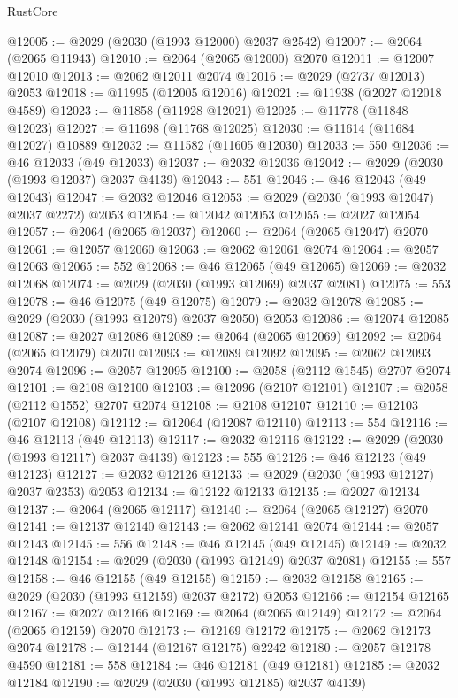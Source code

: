 \begin{lexlean}{RustCore}
\begin{coremodule}
@12005 := @2029 (@2030 (@1993 @12000) @2037 @2542)
@12007 := @2064 (@2065 @11943)
@12010 := @2064 (@2065 @12000) @2070
@12011 := @12007 @12010
@12013 := @2062 @12011 @2074
@12016 := @2029 (@2737 @12013) @2053
@12018 := @11995 (@12005 @12016)
@12021 := @11938 (@2027 @12018 @4589)
@12023 := @11858 (@11928 @12021)
@12025 := @11778 (@11848 @12023)
@12027 := @11698 (@11768 @12025)
@12030 := @11614 (@11684 @12027) @10889
@12032 := @11582 (@11605 @12030)
@12033 := 550
@12036 := @46 @12033 (@49 @12033)
@12037 := @2032 @12036
@12042 := @2029 (@2030 (@1993 @12037) @2037 @4139)
@12043 := 551
@12046 := @46 @12043 (@49 @12043)
@12047 := @2032 @12046
@12053 := @2029 (@2030 (@1993 @12047) @2037 @2272) @2053
@12054 := @12042 @12053
@12055 := @2027 @12054
@12057 := @2064 (@2065 @12037)
@12060 := @2064 (@2065 @12047) @2070
@12061 := @12057 @12060
@12063 := @2062 @12061 @2074
@12064 := @2057 @12063
@12065 := 552
@12068 := @46 @12065 (@49 @12065)
@12069 := @2032 @12068
@12074 := @2029 (@2030 (@1993 @12069) @2037 @2081)
@12075 := 553
@12078 := @46 @12075 (@49 @12075)
@12079 := @2032 @12078
@12085 := @2029 (@2030 (@1993 @12079) @2037 @2050) @2053
@12086 := @12074 @12085
@12087 := @2027 @12086
@12089 := @2064 (@2065 @12069)
@12092 := @2064 (@2065 @12079) @2070
@12093 := @12089 @12092
@12095 := @2062 @12093 @2074
@12096 := @2057 @12095
@12100 := @2058 (@2112 @1545) @2707 @2074
@12101 := @2108 @12100
@12103 := @12096 (@2107 @12101)
@12107 := @2058 (@2112 @1552) @2707 @2074
@12108 := @2108 @12107
@12110 := @12103 (@2107 @12108)
@12112 := @12064 (@12087 @12110)
@12113 := 554
@12116 := @46 @12113 (@49 @12113)
@12117 := @2032 @12116
@12122 := @2029 (@2030 (@1993 @12117) @2037 @4139)
@12123 := 555
@12126 := @46 @12123 (@49 @12123)
@12127 := @2032 @12126
@12133 := @2029 (@2030 (@1993 @12127) @2037 @2353) @2053
@12134 := @12122 @12133
@12135 := @2027 @12134
@12137 := @2064 (@2065 @12117)
@12140 := @2064 (@2065 @12127) @2070
@12141 := @12137 @12140
@12143 := @2062 @12141 @2074
@12144 := @2057 @12143
@12145 := 556
@12148 := @46 @12145 (@49 @12145)
@12149 := @2032 @12148
@12154 := @2029 (@2030 (@1993 @12149) @2037 @2081)
@12155 := 557
@12158 := @46 @12155 (@49 @12155)
@12159 := @2032 @12158
@12165 := @2029 (@2030 (@1993 @12159) @2037 @2172) @2053
@12166 := @12154 @12165
@12167 := @2027 @12166
@12169 := @2064 (@2065 @12149)
@12172 := @2064 (@2065 @12159) @2070
@12173 := @12169 @12172
@12175 := @2062 @12173 @2074
@12178 := @12144 (@12167 @12175) @2242
@12180 := @2057 @12178 @4590
@12181 := 558
@12184 := @46 @12181 (@49 @12181)
@12185 := @2032 @12184
@12190 := @2029 (@2030 (@1993 @12185) @2037 @4139)

\end{coremodule}
\end{lexlean}
